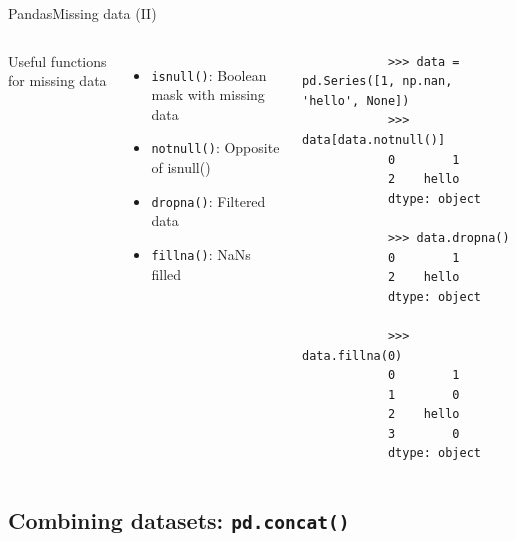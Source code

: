 \documentclass[10pt,compress]{beamer} %
\begin{document}
\begin{frame}[fragile]{Pandas}{Missing data (II)}
	\begin{columns}
		Useful functions for missing data
		\begin{itemize}
			\item \texttt{isnull()}: Boolean mask with missing data
			\item \texttt{notnull()}: Opposite of isnull()
			\item \texttt{dropna()}: Filtered data
			\item \texttt{fillna()}: NaNs filled
		\end{itemize}

		\begin{exampleblock}{}
		\vspace{-0.2cm} 
			\begin{lstlisting}
			>>> data = pd.Series([1, np.nan, 'hello', None])
			>>> data[data.notnull()]
			0        1
			2    hello
			dtype: object

			>>> data.dropna()
			0        1
			2    hello
			dtype: object

			>>> data.fillna(0)
			0        1
			1        0
			2    hello
			3        0
			dtype: object
			\end{lstlisting}
			\vspace{-0.2cm} 
		\end{exampleblock}
	\end{columns}
\end{frame}

\subsection{Combining datasets: \texttt{pd.concat()}}
\end{document}
